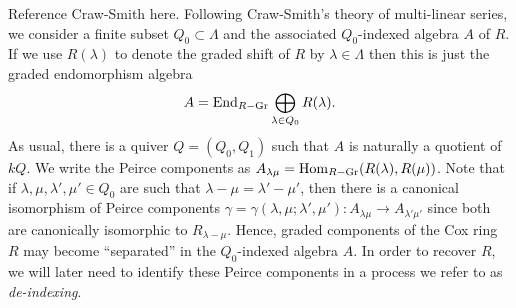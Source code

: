\documentclass[12pt]{amsart}
\begin{document}
{\red Reference Craw-Smith here}. Following Craw-Smith's theory of multi-linear series, we consider a finite subset $Q_0 \subset \Lambda$ and the associated $Q_0$-indexed algebra $A$ of $R$. If we use $R(\lambda)$ to denote the graded shift of $R$ by $\lambda \in \Lambda$ then this is just the graded endomorphism algebra
$$ A = \operatorname{End}_{R-\operatorname{Gr}} \bigoplus_{\lambda \in Q_0} R(\lambda).$$
As usual, there is a quiver $Q = (Q_0,Q_1)$ such that $A$ is naturally a quotient of $kQ$. 
We write the Peirce components as $A_{\lambda\mu} = \operatorname{Hom}_{R-\operatorname{Gr}}(R(\lambda),R(\mu))$. Note that if $\lambda,\mu,\lambda',\mu' \in Q_0$ are such that $\lambda - \mu = \lambda' - \mu'$, then there is a canonical isomorphism of Peirce components $\gamma = \gamma(\lambda,\mu;\lambda',\mu') \colon A_{\lambda\mu} \to A_{\lambda'\mu'}$ since both are canonically isomorphic to $R_{\lambda - \mu}$. Hence, graded components of the Cox ring $R$ may become ``separated'' in the $Q_0$-indexed algebra $A$. In order to recover $R$, we will later need to identify these Peirce components in a process we refer to as {\em de-indexing}. 
\end{document}
